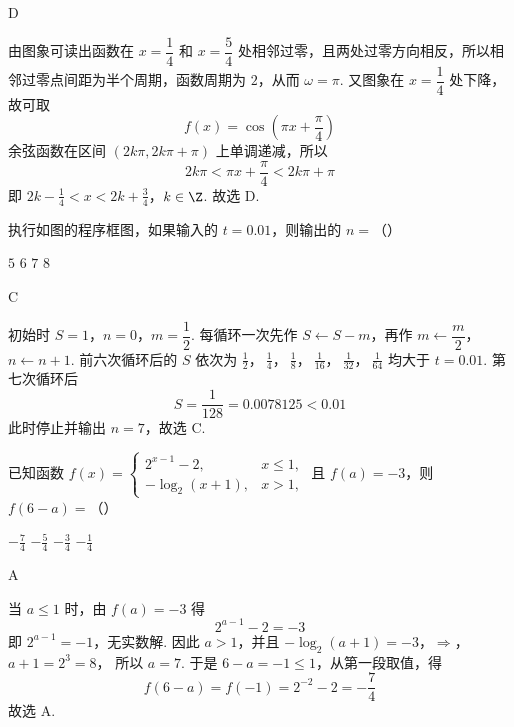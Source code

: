 \begin{answer}
D
\end{answer}

\begin{solution}
由图象可读出函数在 \(x=\dfrac14\) 和 \(x=\dfrac54\) 处相邻过零，且两处过零方向相反，所以相邻过零点间距为半个周期，函数周期为 \(2\)，从而 \(\omega=\pi\). 又图象在 \(x=\dfrac14\) 处下降，故可取
\[
f(x)=\cos\left(\pi x+\frac{\pi}{4}\right)
\]
余弦函数在区间 \((2k\pi,2k\pi+\pi)\) 上单调递减，所以
\[
2k\pi<\pi x+\frac{\pi}{4}<2k\pi+\pi
\]
即
\(2k-\frac14<x<2k+\frac34\)，\(k\in\Z\).
故选 D.
\end{solution}

\begin{problem}
执行如图的程序框图，如果输入的 \(t = 0.01\)，则输出的 \(n =\)（\quad）


\choices
    {\(5\)}
    {\(6\)}
    {\(7\)}
    {\(8\)}
\end{problem}

\begin{answer}
C
\end{answer}

\begin{solution}
初始时 \(S=1\)，\(n=0\)，\(m=\dfrac12\). 每循环一次先作 \(S\leftarrow S-m\)，再作 \(m\leftarrow\dfrac m2\)，\(n\leftarrow n+1\). 前六次循环后的 \(S\) 依次为
\(\frac12\)，\(\ \frac14\)，\(\ \frac18\)，\(\ \frac1{16}\)，\(\ \frac1{32}\)，\(\ \frac1{64}\)
均大于 \(t=0.01\). 第七次循环后
\[
S=\frac1{128}=0.0078125<0.01
\]
此时停止并输出 \(n=7\)，故选 C.
\end{solution}

\begin{problem}
已知函数 \( f(x) = \begin{cases}
2^{x - 1} - 2, & x \leqslant 1,\\
-\log_2(x + 1), & x > 1,
\end{cases} \) 且 \( f(a) = -3 \)，则 \(f(6-a)=\)（\quad）

\choices
    {\(-\frac{7}{4}\)}
    {\(-\frac{5}{4}\)}
    {\(-\frac{3}{4}\)}
    {\(-\frac{1}{4}\)}
\end{problem}

\begin{answer}
A
\end{answer}

\begin{solution}
当 \(a\leqslant1\) 时，由 \(f(a)=-3\) 得
\[
2^{a-1}-2=-3
\]
即 \(2^{a-1}=-1\)，无实数解. 因此 \(a>1\)，并且
\(-\log_{2}(a+1)=-3\)，\(\Longrightarrow\)，\(a+1=2^{3}=8\)，
所以 \(a=7\). 于是 \(6-a=-1\leqslant1\)，从第一段取值，得
\[
f(6-a)=f(-1)=2^{-2}-2=-\frac74
\]
故选 A.
\end{solution}

